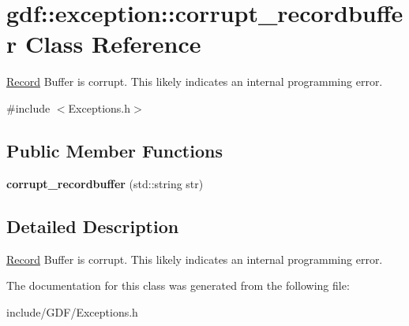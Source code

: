 \hypertarget{classgdf_1_1exception_1_1corrupt__recordbuffer}{
\section{gdf::exception::corrupt\_\-recordbuffer Class Reference}
\label{classgdf_1_1exception_1_1corrupt__recordbuffer}
}


\hyperlink{classgdf_1_1_record}{Record} Buffer is corrupt. This likely indicates an internal programming error.  




{\ttfamily \#include $<$Exceptions.h$>$}

\subsection*{Public Member Functions}
\begin{DoxyCompactItemize}
\item 
\hypertarget{classgdf_1_1exception_1_1corrupt__recordbuffer_ad2f1cee8739858a2990d9bf0bb1e971f}{
{\bfseries corrupt\_\-recordbuffer} (std::string str)}
\label{classgdf_1_1exception_1_1corrupt__recordbuffer_ad2f1cee8739858a2990d9bf0bb1e971f}

\end{DoxyCompactItemize}


\subsection{Detailed Description}
\hyperlink{classgdf_1_1_record}{Record} Buffer is corrupt. This likely indicates an internal programming error. 

The documentation for this class was generated from the following file:\begin{DoxyCompactItemize}
\item 
include/GDF/Exceptions.h\end{DoxyCompactItemize}
